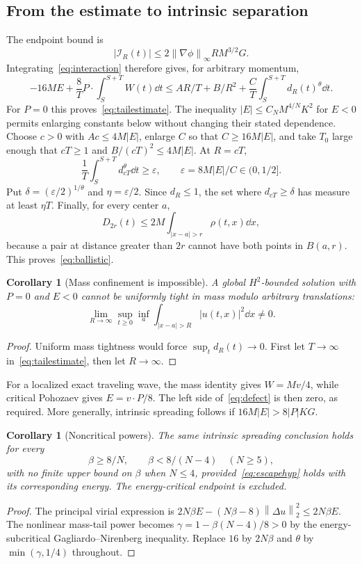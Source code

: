 \documentclass[11pt,a4paper]{article}
\newtheorem{corollary}[theorem]{Corollary}
\theoremstyle{remark}\newtheorem{remark}[theorem]{Remark}
\newcommand{\norm}[1]{\left\|#1\right\|}
\begin{document}
\subsection{From the estimate to intrinsic separation}
The endpoint bound is
\[
 |\mathcal I_R(t)|\le2\norm{\nabla\phi}_\infty R M^{3/2}G.
\]
Integrating~\eqref{eq:interaction} therefore gives, for arbitrary momentum,
\begin{equation}\label{eq:defect}
 -16ME+\frac8T P\cdot\int_S^{S+T}W(t)\dd t
 \le A R/T+B/R^2+\frac CT\int_S^{S+T}d_R(t)^\theta\dd t.
\end{equation}
For $P=0$ this proves~\eqref{eq:tailestimate}. The inequality $|E|\le C_NM^{4/N}K^2$ for $E<0$ permits enlarging constants below without changing their stated dependence. Choose $c>0$ with $Ac\le4M|E|$, enlarge $C$ so that $C\ge16M|E|$, and take $T_0$ large enough that $cT\ge1$ and $B/(cT)^2\le4M|E|$. At $R=cT$,
\[
 \frac1T\int_S^{S+T}d_{cT}^\theta\dd t\ge\varepsilon,
 \qquad \varepsilon=8M|E|/C\in(0,1/2].
\]
Put $\delta=(\varepsilon/2)^{1/\theta}$ and $\eta=\varepsilon/2$. Since $d_R\le1$, the set where $d_{cT}\ge\delta$ has measure at least $\eta T$. Finally, for every center $a$,
\[
 D_{2r}(t)\le2M\int_{|x-a|>r}\rho(t,x)\dd x,
\]
because a pair at distance greater than $2r$ cannot have both points in $B(a,r)$. This proves~\eqref{eq:ballistic}.

\begin{corollary}[Mass confinement is impossible]
A global $H^2$-bounded solution with $P=0$ and $E<0$ cannot be uniformly tight in mass modulo arbitrary translations:
\[
 \lim_{R\to\infty}\sup_{t\ge0}\inf_a\int_{|x-a|>R}|u(t,x)|^2\dd x\ne0.
\]
\end{corollary}
\begin{proof}
Uniform mass tightness would force $\sup_t d_R(t)\to0$. First let $T\to\infty$ in~\eqref{eq:tailestimate}, then let $R\to\infty$.
\end{proof}
For a localized exact traveling wave, the mass identity gives $W=Mv/4$, while critical Pohozaev gives $E=v\cdot P/8$. The left side of~\eqref{eq:defect} is then zero, as required. More generally, intrinsic spreading follows if $16M|E|>8|P|KG$.

\begin{corollary}[Noncritical powers]
The same intrinsic spreading conclusion holds for every
\[
 \beta\ge8/N,\qquad \beta<8/(N-4)\quad(N\ge5),
\]
with no finite upper bound on $\beta$ when $N\le4$, provided~\eqref{eq:escapehyp} holds with its corresponding energy. The energy-critical endpoint is excluded.
\end{corollary}
\begin{proof}
The principal virial expression is
$2N\beta E-(N\beta-8)\norm{\Delta u}_2^2\le2N\beta E$.
The nonlinear mass-tail power becomes
$\gamma=1-\beta(N-4)/8>0$ by the energy-subcritical Gagliardo--Nirenberg inequality. Replace $16$ by $2N\beta$ and $\theta$ by $\min(\gamma,1/4)$ throughout.
\end{proof}
\end{document}
